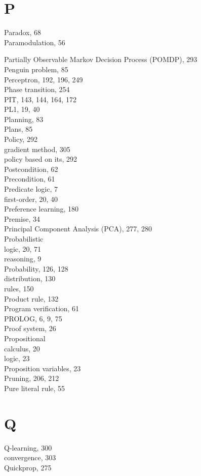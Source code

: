 \documentclass[10pt]{article}
\begin{document}
\section*{P}
Paradox, 68\\
Paramodulation, 56

Partially Observable Markov Decision Process (POMDP), 293\\
Penguin problem, 85\\
Perceptron, 192, 196, 249\\
Phase transition, 254\\
PIT, 143, 144, 164, 172\\
PL1, 19, 40\\
Planning, 83\\
Plans, 85\\
Policy, 292\\
gradient method, 305\\
policy based on its, 292\\
Postcondition, 62\\
Precondition, 61\\
Predicate logic, 7\\
first-order, 20, 40\\
Preference learning, 180\\
Premise, 34\\
Principal Component Analysis (PCA), 277, 280\\
Probabilistic\\
logic, 20, 71\\
reasoning, 9\\
Probability, 126, 128\\
distribution, 130\\
rules, 150\\
Product rule, 132\\
Program verification, 61\\
PROLOG, 6, 9, 75\\
Proof system, 26\\
Propositional\\
calculus, 20\\
logic, 23\\
Proposition variables, 23\\
Pruning, 206, 212\\
Pure literal rule, 55

\section*{Q}
Q-learning, 300\\
convergence, 303\\
Quickprop, 275
\end{document}
